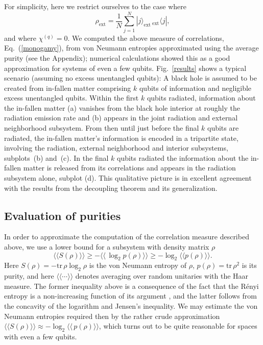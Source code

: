 \documentclass[twocolumn,aps,prl]{revtex4}
\begin{document}
For simplicity, here we restrict ourselves to the case where
\begin{equation}
\rho_{\text{ext}}=\frac{1}{N}\sum_{j=1}^N
 |j\rangle_{\text{ext}}\,{}_{\text{ext}}\!\langle j|,
\end{equation}
and where $\chi^{(q)}=0$. We computed the above measure of correlations,
Eq.~(\ref{monogamy}), from von Neumann entropies approximated using the
average purity (see the Appendix); numerical
calculations showed this as a good approximation for systems of even a
few qubits. Fig.~\ref{results} shows a typical scenario (assuming no
excess unentangled qubits): A black hole is assumed to be
created from in-fallen matter comprising $k$ qubits of information and
negligible excess unentangled qubits. Within the first $k$ qubits
radiated, information about the in-fallen matter (a) vanishes from the
black hole interior at roughly the radiation emission rate and (b) appears
in the joint radiation and external neighborhood subsystem. From then
until just before the final $k$ qubits are radiated, the in-fallen
matter's information is encoded in a tripartite state, involving the
radiation, external neighborhood and interior subsystems, subplots~(b)
and~(c). In the final $k$ qubits radiated the information about the
in-fallen matter is released from its correlations and appears in the
radiation subsystem alone, subplot (d). This qualitative picture is
in excellent agreement with the results from the decoupling
theorem and its generalization.

\subsection*{Evaluation of purities}
\label{purities}

In order to approximate the computation of the correlation measure
described above, we use a lower bound for a subsystem with
density matrix $\rho$
\begin{equation}
\langle\!\langle S(\rho) \rangle\!\rangle
\ge -\langle\!\langle \,\log_2 p(\rho) \rangle\!\rangle
\ge -\log_2 \langle\!\langle p(\rho) \rangle\!\rangle. %
\end{equation}
Here $S(\rho)=-{\text{tr}}\, \rho \log_2 \rho$ is the von Neumann entropy
of $\rho$, $p(\rho)= {\text{tr}}\, \rho^2$ is its purity, and here
$\langle\!\langle \cdots \rangle\!\rangle$ denotes averaging over
random unitaries with the Haar measure. The former inequality above is
a consequence of the fact that the R\'enyi entropy is a non-increasing
function of its argument \cite{ap1}, and the latter follows from the
concavity of the logarithm and Jensen's inequality. We may estimate
the von Neumann entropies required then by the rather crude
approximation
$\langle\!\langle S(\rho) \rangle\!\rangle
\approx -\log_2 \langle\!\langle \,p(\rho) \rangle\!\rangle$, 
which turns out to be quite reasonable for spaces with even a few qubits.
\end{document}
